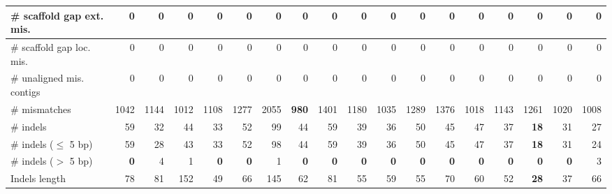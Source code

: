 \documentclass[12pt,a4paper]{article}
\begin{document}
\begin{table}[ht]
\begin{center}
\begin{tabular}{|l*{17}{|r}|}
\# scaffold gap ext. mis. & 0 & 0 & 0 & 0 & 0 & 0 & 0 & 0 & 0 & 0 & 0 & 0 & 0 & 0 & 0 & 0 & 0 \\ \hline
\# scaffold gap loc. mis. & 0 & 0 & 0 & 0 & 0 & 0 & 0 & 0 & 0 & 0 & 0 & 0 & 0 & 0 & 0 & 0 & 0 \\ \hline
\# unaligned mis. contigs & 0 & 0 & 0 & 0 & 0 & 0 & 0 & 0 & 0 & 0 & 0 & 0 & 0 & 0 & 0 & 0 & 0 \\ \hline
\# mismatches & 1042 & 1144 & 1012 & 1108 & 1277 & 2055 & {\bf 980} & 1401 & 1180 & 1035 & 1289 & 1376 & 1018 & 1143 & 1261 & 1020 & 1008 \\ \hline
\# indels & 59 & 32 & 44 & 33 & 52 & 99 & 44 & 59 & 39 & 36 & 50 & 45 & 47 & 37 & {\bf 18} & 31 & 27 \\ \hline
\hspace{5mm}\# indels ($\leq$ 5 bp) & 59 & 28 & 43 & 33 & 52 & 98 & 44 & 59 & 39 & 36 & 50 & 45 & 47 & 37 & {\bf 18} & 31 & 24 \\ \hline
\hspace{5mm}\# indels ($>$ 5 bp) & {\bf 0} & 4 & 1 & {\bf 0} & {\bf 0} & 1 & {\bf 0} & {\bf 0} & {\bf 0} & {\bf 0} & {\bf 0} & {\bf 0} & {\bf 0} & {\bf 0} & {\bf 0} & {\bf 0} & 3 \\ \hline
Indels length & 78 & 81 & 152 & 49 & 66 & 145 & 62 & 81 & 55 & 59 & 55 & 70 & 60 & 52 & {\bf 28} & 37 & 66 \\ \hline
\end{tabular}
\end{center}
\end{table}
\end{document}
